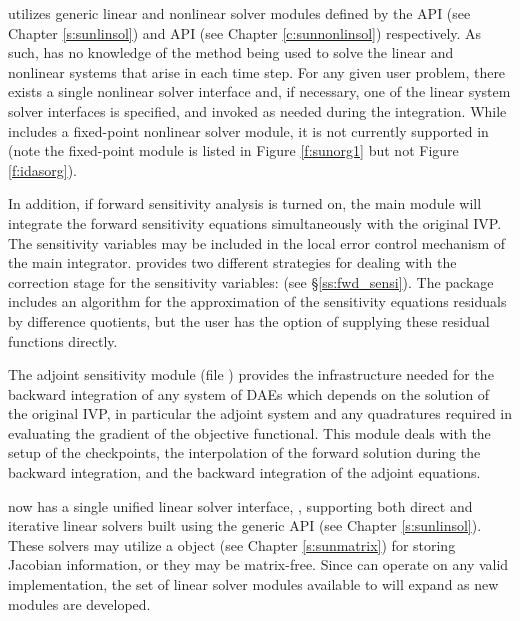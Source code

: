 {\idas} utilizes generic linear and nonlinear solver modules defined by the
{\sunlinsol} API (see Chapter \ref{s:sunlinsol}) and {\sunnonlinsol} API (see
Chapter \ref{c:sunnonlinsol}) respectively. As such, {\idas} has no knowledge
of the method being used to solve the linear and nonlinear systems that
arise in each time step. For any given user problem, there exists a single
nonlinear solver interface and, if necessary, one of the linear system solver
interfaces is specified, and invoked as needed during the integration. While
{\sundials} includes a fixed-point nonlinear solver module, it is not currently
supported in {\idas} (note the fixed-point module is listed in Figure
\ref{f:sunorg1} but not Figure \ref{f:idasorg}).

In addition, if forward sensitivity analysis is turned on, the main module 
will integrate the forward sensitivity equations simultaneously with the original
IVP. The sensitivity variables may be included in the local error control
mechanism of the main integrator.
{\idas} provides two different strategies for dealing with the correction
stage for the sensitivity variables:  
(see \S\ref{ss:fwd_sensi}).
The {\idas} package includes an algorithm for the approximation of the
sensitivity equations residuals by difference quotients, but the user has
the option of supplying these residual functions directly.

The adjoint sensitivity module (file ) provides the infrastructure needed for the 
backward integration of any system of DAEs which depends on the solution 
of the original IVP, in particular the adjoint system and any quadratures required
in evaluating the gradient of the objective functional.  This module deals with
the setup of the checkpoints, the interpolation of the forward solution during
the backward integration, and the backward integration of the adjoint equations.

{\idas} now has a single unified linear solver interface, {\idals},
supporting both direct and iterative linear solvers built using the
generic {\sunlinsol} API (see Chapter \ref{s:sunlinsol}).  These
solvers may utilize a {\sunmatrix} object (see Chapter
\ref{s:sunmatrix}) for storing Jacobian information, or they may be
matrix-free.  Since {\idas} can operate on any valid {\sunlinsol}
implementation, the set of linear solver modules available to {\idas}
will expand as new {\sunlinsol} modules are developed.

